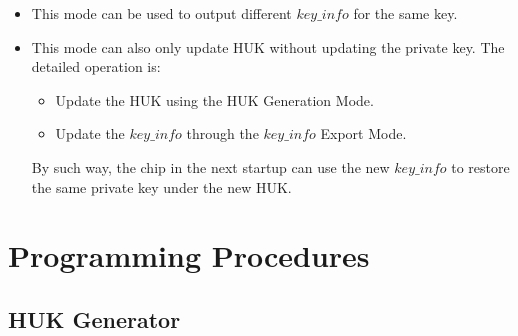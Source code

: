 \documentclass[main\_\_EN.tex]{subfiles}
\begin{document}
\vspace{-0.5em}
\begin{tiplisting}
\vspace{-2em}
\begin{itemize}
    \item This mode can be used to output different \hyperref[para:keyinfo]{\begin{math}key\_info\end{math}} for the same key.
    \item This mode can also only update HUK without updating the private key. The detailed operation is:
    \begin{itemize}
        \item Update the HUK using the HUK Generation Mode.
        \item Update the \hyperref[para:keyinfo]{\begin{math}key\_info\end{math}} through the \hyperref[para:keyinfo]{\begin{math}key\_info\end{math}} Export Mode.
    \end{itemize}
    By such way, the chip in the next startup can use the new \hyperref[para:keyinfo]{\begin{math}key\_info\end{math}} to restore the same private key under the new HUK.
\end{itemize}
\end{tiplisting}


\section{Programming Procedures}
\label{sec:keymng-prog-procedures}

\subsection{HUK Generator}
\label{sec:huk-generate}
\end{document}
